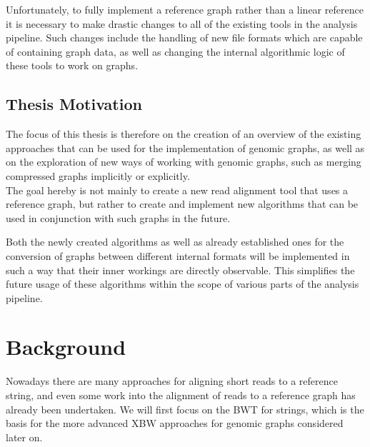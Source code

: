 \documentclass[a4paper,12pt,twoside,BCOR=10mm]{scrbook}
\begin{document}
Unfortunately, to fully implement a reference graph rather than a linear reference
it is necessary to make drastic changes to all of the existing tools in the analysis pipeline.
Such changes include the handling of new file formats which are capable of containing graph data,
as well as changing the internal algorithmic logic of these tools to work on graphs.

\section{Thesis Motivation}

The focus of this thesis is therefore on the creation of an overview of the existing
approaches that can be used for the implementation of genomic graphs,
as well as on the exploration of new ways of working with genomic graphs,
such as merging compressed graphs implicitly or explicitly. \\
The goal hereby is not mainly to create a new read alignment tool that uses
a reference graph, but rather to create and implement new algorithms that can
be used in conjunction with such graphs in the future.

Both the newly created algorithms as well as already established ones
for the conversion of graphs between different internal formats
will be implemented in such a way that their inner workings
are directly observable. This simplifies the future usage of these algorithms
within the scope of various parts of the analysis pipeline.

\chapter{Background}
%

Nowadays there are many approaches for aligning short reads to a reference string,
and even some work into the alignment of reads to a reference graph has already been
undertaken.
We will first focus on the BWT for strings, which is the basis for the more advanced
XBW approaches for genomic graphs considered later on.
\end{document}
